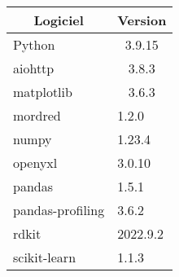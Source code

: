 \begin{table}[ht]
    \centering
    \begin{tabular}{|l|l|}
    \hline
    \multicolumn{1}{|c|}{\textbf{Logiciel}} & \multicolumn{1}{c|}{\textbf{Version}} \\ \hline
    Python                                  & \multicolumn{1}{c|}{3.9.15}           \\ \hline
    aiohttp                                 & \multicolumn{1}{c|}{3.8.3}            \\ \hline
    matplotlib                              & \multicolumn{1}{c|}{3.6.3}            \\ \hline
    mordred                                 & 1.2.0                                 \\ \hline
    numpy                                   & 1.23.4                                \\ \hline
    openyxl                                 & 3.0.10                                \\ \hline
    pandas                                  & 1.5.1                                 \\ \hline
    pandas-profiling                        & 3.6.2                                 \\ \hline
    rdkit                                   & 2022.9.2                              \\ \hline
    scikit-learn                            & 1.1.3                                 \\ \hline
    \end{tabular}
\end{table}


